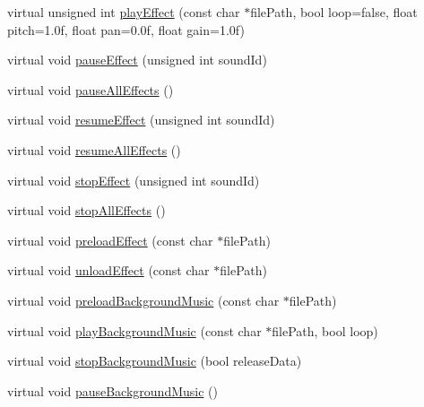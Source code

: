 \begin{DoxyCompactItemize}
\item 
virtual unsigned int \hyperlink{classCocosDenshion_1_1android_1_1AndroidJavaEngine_afbff85587cb49beee14ea5814209ca58}{play\+Effect} (const char $\ast$file\+Path, bool loop=false, float pitch=1.\+0f, float pan=0.\+0f, float gain=1.\+0f)
\item 
virtual void \hyperlink{classCocosDenshion_1_1android_1_1AndroidJavaEngine_a6fae84fc04d9e8ae2e38684f616df9e9}{pause\+Effect} (unsigned int sound\+Id)
\item 
virtual void \hyperlink{classCocosDenshion_1_1android_1_1AndroidJavaEngine_a6f43c4386764a96b0fd604d2bf527274}{pause\+All\+Effects} ()
\item 
virtual void \hyperlink{classCocosDenshion_1_1android_1_1AndroidJavaEngine_a0403188379ce32b1598292bcdf49c07d}{resume\+Effect} (unsigned int sound\+Id)
\item 
virtual void \hyperlink{classCocosDenshion_1_1android_1_1AndroidJavaEngine_a52558e48db6fb0dd330d18c7f569aa85}{resume\+All\+Effects} ()
\item 
virtual void \hyperlink{classCocosDenshion_1_1android_1_1AndroidJavaEngine_ad400c573b14ae0a45e3977808acae5fb}{stop\+Effect} (unsigned int sound\+Id)
\item 
virtual void \hyperlink{classCocosDenshion_1_1android_1_1AndroidJavaEngine_a38d6736750cc2832b9a5dea632f293b6}{stop\+All\+Effects} ()
\item 
virtual void \hyperlink{classCocosDenshion_1_1android_1_1AndroidJavaEngine_ab6bfd3367f805e7df12ed912e7933c22}{preload\+Effect} (const char $\ast$file\+Path)
\item 
virtual void \hyperlink{classCocosDenshion_1_1android_1_1AndroidJavaEngine_abd45269bfe825e27b489fccc963b57c0}{unload\+Effect} (const char $\ast$file\+Path)
\item 
virtual void \hyperlink{classCocosDenshion_1_1android_1_1AndroidJavaEngine_afa06edc30986b357a9bb65f053260af0}{preload\+Background\+Music} (const char $\ast$file\+Path)
\item 
virtual void \hyperlink{classCocosDenshion_1_1android_1_1AndroidJavaEngine_aeb8086c0fa8689075d4e2d2bf05f9439}{play\+Background\+Music} (const char $\ast$file\+Path, bool loop)
\item 
virtual void \hyperlink{classCocosDenshion_1_1android_1_1AndroidJavaEngine_af9a747a87ff0744c9de7f76208637e0c}{stop\+Background\+Music} (bool release\+Data)
\item 
virtual void \hyperlink{classCocosDenshion_1_1android_1_1AndroidJavaEngine_a0a1f417bca73e4c63e261046948cf23f}{pause\+Background\+Music} ()

\end{DoxyCompactItemize}
